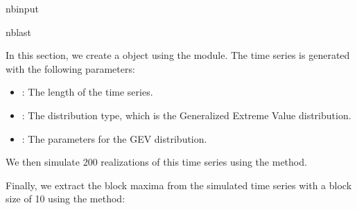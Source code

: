 \documentclass[a4paper,11pt,openany,english]{sphinxmanual}
\begin{document}
\begin{sphinxuseclass}{nbinput}
\begin{sphinxuseclass}{nblast}
{
\begin{sphinxVerbatim}[commandchars=\\\{\}]
\llap{\color{nbsphinxin}[1]:\,\hspace{\fboxrule}\hspace{\fboxsep}}   
   
\end{sphinxVerbatim}
}

\end{sphinxuseclass}
\end{sphinxuseclass}
\sphinxAtStartPar
In this section, we create a  object  using the  module. The time series is generated with the following parameters:
\begin{itemize}
\item {} 
\sphinxAtStartPar
{}: The length of the time series.

\item {} 
\sphinxAtStartPar
{}: The distribution type, which is the Generalized Extreme Value distribution.

\item {} 
\sphinxAtStartPar
{}: The parameters for the GEV distribution.

\end{itemize}

\sphinxAtStartPar
We then simulate 200 realizations of this time series using the  method.

\sphinxAtStartPar
Finally, we extract the block maxima from the simulated time series with a block size of 10 using the  method:
\end{document}
